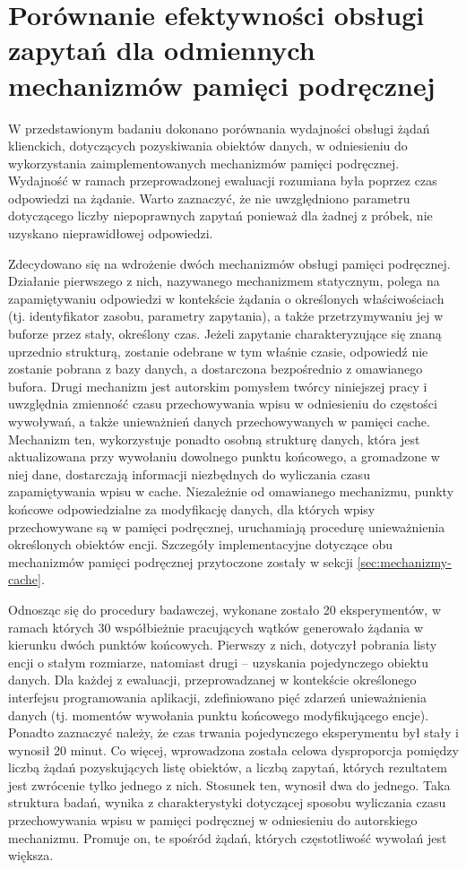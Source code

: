 \section{Porównanie efektywności obsługi zapytań dla odmiennych mechanizmów pamięci podręcznej}
W przedstawionym badaniu dokonano porównania wydajności obsługi żądań klienckich, dotyczących pozyskiwania obiektów danych, w odniesieniu do wykorzystania zaimplementowanych mechanizmów pamięci podręcznej. Wydajność w ramach przeprowadzonej ewaluacji rozumiana była poprzez czas odpowiedzi na żądanie. Warto zaznaczyć, że nie uwzględniono parametru dotyczącego liczby niepoprawnych zapytań ponieważ dla żadnej z próbek, nie uzyskano nieprawidłowej odpowiedzi.

Zdecydowano się na wdrożenie dwóch mechanizmów obsługi pamięci podręcznej. Działanie pierwszego z nich, nazywanego mechanizmem statycznym, polega na zapamiętywaniu odpowiedzi w kontekście żądania o określonych właściwościach (tj. identyfikator zasobu, parametry zapytania), a także przetrzymywaniu jej w buforze przez stały, określony czas. Jeżeli zapytanie charakteryzujące się znaną uprzednio strukturą, zostanie odebrane w tym właśnie czasie, odpowiedź nie zostanie pobrana z bazy danych, a dostarczona bezpośrednio z omawianego bufora. Drugi mechanizm jest autorskim pomysłem twórcy niniejszej pracy i uwzględnia zmienność czasu przechowywania wpisu w odniesieniu do częstości wywoływań, a także unieważnień danych przechowywanych w pamięci cache. Mechanizm ten, wykorzystuje ponadto osobną strukturę danych, która jest aktualizowana przy wywołaniu dowolnego punktu końcowego, a gromadzone w niej dane, dostarczają informacji niezbędnych do wyliczania czasu zapamiętywania wpisu w cache. Niezależnie od omawianego mechanizmu, punkty końcowe odpowiedzialne za modyfikację danych, dla których wpisy przechowywane są w pamięci podręcznej, uruchamiają procedurę unieważnienia określonych obiektów encji. Szczegóły implementacyjne dotyczące obu mechanizmów pamięci podręcznej przytoczone zostały w sekcji \ref{sec:mechanizmy-cache}.

Odnosząc się do procedury badawczej, wykonane zostało 20 eksperymentów, w ramach których 30 współbieżnie pracujących wątków generowało żądania w kierunku dwóch punktów końcowych. Pierwszy z nich, dotyczył pobrania listy encji o stałym rozmiarze, natomiast drugi -- uzyskania pojedynczego obiektu danych. Dla każdej z ewaluacji, przeprowadzanej w kontekście określonego interfejsu programowania aplikacji, zdefiniowano pięć zdarzeń unieważnienia danych (tj. momentów wywołania punktu końcowego modyfikującego encje). Ponadto zaznaczyć należy, że czas trwania pojedynczego eksperymentu był stały i wynosił 20 minut. Co więcej, wprowadzona została celowa dysproporcja pomiędzy liczbą żądań pozyskujących listę obiektów, a liczbą zapytań, których rezultatem jest zwrócenie tylko jednego z nich. Stosunek ten, wynosił dwa do jednego. Taka struktura badań, wynika z charakterystyki dotyczącej sposobu wyliczania czasu przechowywania wpisu w pamięci podręcznej w odniesieniu do autorskiego mechanizmu. Promuje on, te spośród żądań, których częstotliwość wywołań jest większa.

